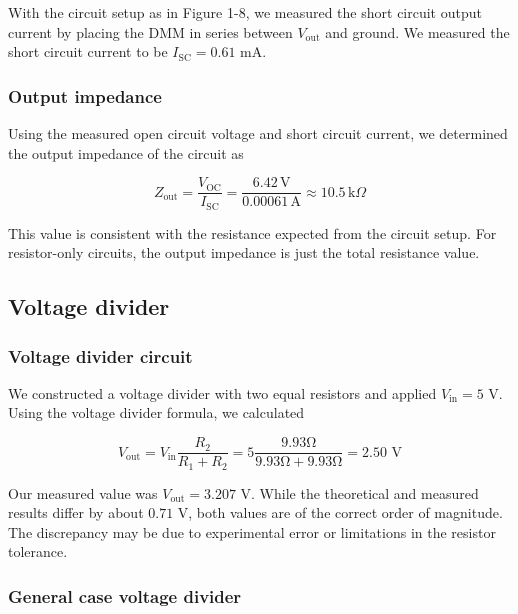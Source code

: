 \documentclass{article}
\begin{document}
With the circuit setup as in Figure 1-8, we measured the short circuit output current by placing the DMM in series between $V_\text{out}$ and ground. We measured the short circuit current to be $I_{\text{SC}}=0.61 \text{ mA}$.

\subsubsection{Output impedance}

Using the measured open circuit voltage and short circuit current, we determined the output impedance of the circuit as

\begin{equation}
    Z_{\text{out}} = \frac{V_\text{OC}}{I_\text{SC}}
    = \frac{6.42 \,\text{V}}{0.00061 \,\text{A}}
    \approx 10.5 \,\text{k}\Omega
\end{equation}

\noindent This value is consistent with the resistance expected from the circuit setup. For resistor-only circuits, the output impedance is just the total resistance value.

\subsection{Voltage divider}

\subsubsection{Voltage divider circuit}

We constructed a voltage divider with two equal resistors and applied $V_\text{in}=5\text{ V}$. Using the voltage divider formula, we calculated

\begin{equation}
    V_\text{out}=V_\text{in}\frac{R_2}{R_1+R_2}=5\frac{9.93\si{\ohm}}{9.93\si{\ohm}+9.93\si{\ohm}}=2.50\text{ V}
\end{equation}

\noindent Our measured value was $V_\text{out}=3.207\text{ V}$. While the theoretical and measured results differ by about $0.71\text{ V}$, both values are of the correct order of magnitude. The discrepancy may be due to experimental error or limitations in the resistor tolerance.

\subsubsection{General case voltage divider}
\end{document}
